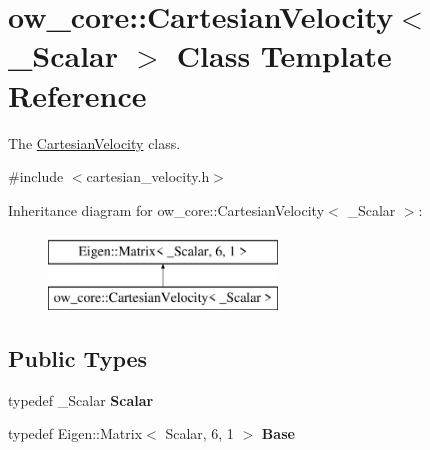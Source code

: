 \hypertarget{classow__core_1_1CartesianVelocity}{}\section{ow\+\_\+core\+:\+:Cartesian\+Velocity$<$ \+\_\+\+Scalar $>$ Class Template Reference}
\label{classow__core_1_1CartesianVelocity}


The \hyperlink{classow__core_1_1CartesianVelocity}{Cartesian\+Velocity} class.  




{\ttfamily \#include $<$cartesian\+\_\+velocity.\+h$>$}

Inheritance diagram for ow\+\_\+core\+:\+:Cartesian\+Velocity$<$ \+\_\+\+Scalar $>$\+:\begin{figure}[H]
\begin{center}
\leavevmode
\includegraphics[height=2.000000cm]{d5/df0/classow__core_1_1CartesianVelocity}
\end{center}
\end{figure}
\subsection*{Public Types}
\begin{DoxyCompactItemize}
\item 
typedef \+\_\+\+Scalar {\bfseries Scalar}\hypertarget{classow__core_1_1CartesianVelocity_a30fbc2ff4d9a2902e22c1013d5c79adf}{}\label{classow__core_1_1CartesianVelocity_a30fbc2ff4d9a2902e22c1013d5c79adf}

\item 
typedef Eigen\+::\+Matrix$<$ Scalar, 6, 1 $>$ {\bfseries Base}\hypertarget{classow__core_1_1CartesianVelocity_afb19f3c2efe2446b76a716a0809e960f}{}\label{classow__core_1_1CartesianVelocity_afb19f3c2efe2446b76a716a0809e960f}

\end{DoxyCompactItemize}
